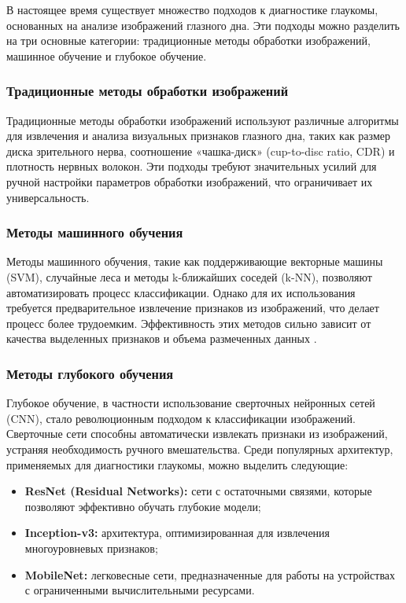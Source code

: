 {    В настоящее время существует множество подходов к диагностике глаукомы, основанных на анализе изображений глазного дна. Эти подходы можно разделить на три основные категории: традиционные методы обработки изображений, машинное обучение и глубокое обучение.

    \subsubsection*{Традиционные методы обработки изображений}

    Традиционные методы обработки изображений используют различные алгоритмы для извлечения и анализа визуальных признаков глазного дна, таких как размер диска зрительного нерва, соотношение «чашка-диск» (cup-to-disc ratio, CDR) и плотность нервных волокон. Эти подходы требуют значительных усилий для ручной настройки параметров обработки изображений, что ограничивает их универсальность.

    \subsubsection*{Методы машинного обучения}

    Методы машинного обучения, такие как поддерживающие векторные машины (SVM), случайные леса и методы k-ближайших соседей (k-NN), позволяют автоматизировать процесс классификации. Однако для их использования требуется предварительное извлечение признаков из изображений, что делает процесс более трудоемким. Эффективность этих методов сильно зависит от качества выделенных признаков и объема размеченных данных \cite{machine_learnig}.

    \subsubsection*{Методы глубокого обучения}

    Глубокое обучение, в частности использование сверточных нейронных сетей (CNN), стало революционным подходом к классификации изображений. Сверточные сети способны автоматически извлекать признаки из изображений, устраняя необходимость ручного вмешательства. Среди популярных архитектур, применяемых для диагностики глаукомы, можно выделить следующие:
    \begin{itemize}
        \item \textbf{ResNet (Residual Networks):} сети с остаточными связями, которые позволяют эффективно обучать глубокие модели;
        \item \textbf{Inception-v3:} архитектура, оптимизированная для извлечения многоуровневых признаков;
        \item \textbf{MobileNet:} легковесные сети, предназначенные для работы на устройствах с ограниченными вычислительными ресурсами.
    \end{itemize}

}
